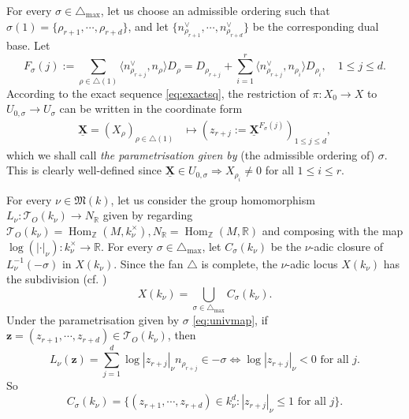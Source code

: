 \documentclass[11pt,letterpaper]{amsart}
\newcommand{\BR}{{\mathbb {R}}}
\newcommand{\BZ}{{\mathbb {Z}}}
\newcommand{\CT}{{\mathcal {T}}}
\newcommand{\Hom}{\operatorname{Hom}}
\newcommand{\XX}{\underline{\mathbf{X}}}
\theoremstyle{plain}
\numberwithin{equation}{section}
\theoremstyle{definition}
\theoremstyle{remark}
\begin{document}
For every $\sigma\in\triangle_{\max}$, let us choose an admissible ordering such that $\sigma(1)=\{\rho_{r+1},\cdots,\rho_{r+d}\}$, and let $\{n_{\rho_{r+1}}^{\vee},\cdots,n_{\rho_{r+d}}^{\vee}\}$ be the corresponding dual base. Let \begin{equation}\label{eq:Fj}
	F_\sigma(j):=\sum_{\rho\in\triangle(1)}\langle n_{\rho_{r+j}}^\vee,n_{\rho}\rangle D_\rho=D_{\rho_{r+j}}+\sum_{i=1}^{r}\langle n_{\rho_{r+j}}^\vee,n_{\rho_i}\rangle D_{\rho_i},\quad 1\leqslant j\leqslant d.
\end{equation}
According to the exact sequence \eqref{eq:exactsq}, the restriction of $\pi:X_0\to X$ to $U_{0,\sigma}\to U_\sigma$ can be written in the coordinate form
\begin{equation}\label{eq:univmap}
	\begin{split}
		\XX=(X_\rho)_{\rho\in\triangle(1)}&\longmapsto  \left(z_{r+j}:=\XX^{F_\sigma(j)}\right)_{1\leqslant j\leqslant d},
	\end{split}
\end{equation} which we shall call \emph{the parametrisation given by} (the admissible ordering of) $\sigma$. This is clearly well-defined since $\XX\in U_{0,\sigma}\Rightarrow X_{\rho_i}\neq 0$ for all $1\leqslant i\leqslant r$.

For every $\nu\in\mathfrak{M}(k)$, let us consider the group homomorphism \cite[p. 196]{Salberger} $L_\nu:\CT_{O}(k_\nu)\to N_\BR$ given by regarding $\CT_{O}(k_\nu)=\Hom_\BZ(M,k_\nu^\times),N_\BR=\Hom_\BZ(M,\BR)$ and composing with the map $\log (|\cdot|_\nu):k_\nu^\times\to\BR$. For every  $\sigma\in\triangle_{\max}$, let $C_\sigma(k_\nu)$ be the $\nu$-adic closure of $L_\nu^{-1}(-\sigma)$ in $X(k_\nu)$. Since the fan $\triangle$ is complete, the $\nu$-adic locus $X(k_\nu)$ has the subdivision (cf. \cite[Proposition 9.2]{Salberger})
\begin{equation}\label{eq:divisionRpoints}
	X(k_\nu)=\bigcup_{\sigma\in\triangle_{\max}} C_\sigma(k_\nu).
\end{equation}
Under the parametrisation given by $\sigma$ \eqref{eq:univmap}, if $\mathbf{z}=(z_{r+1},\cdots,z_{r+d})\in \CT_{O}(k_\nu)$, then $$L_{\nu}(\mathbf{z})=\sum_{j=1}^{d}\log |z_{r+j}|_{\nu}n_{\rho_{r+j}}\in -\sigma\Longleftrightarrow \log |z_{r+j}|_{\nu}<0 \text{ for all }j.$$
So  \begin{equation}\label{eq:CsigmaR}
	C_{\sigma}(k_\nu)=\{(z_{r+1},\cdots,z_{r+d})\in k_\nu^d:|z_{r+j}|_\nu\leqslant 1 \text{ for all }j\}.
\end{equation}
\end{document}
